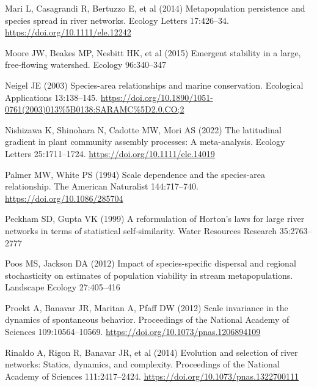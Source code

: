 \documentclass[
  12pt,
]{article}
\newlength{\cslhangindent}
\newlength{\cslentryspacingunit} %
\newenvironment{CSLReferences}[2] %
 {%
  \setlength{\parindent}{0pt}
  \ifodd #1
  \let\oldpar\par
  \def\par{\hangindent=\cslhangindent\oldpar}
  \fi
  \setlength{\parskip}{#2\cslentryspacingunit}
 }%
 {}
\begin{document}
\begin{CSLReferences}{1}{0}
\leavevmode{}%
Mari L, Casagrandi R, Bertuzzo E, et al (2014) Metapopulation persistence and species spread in river networks. Ecology Letters 17:426--34. \url{https://doi.org/10.1111/ele.12242}

\leavevmode{}%
Moore JW, Beakes MP, Nesbitt HK, et al (2015) Emergent stability in a large, free-flowing watershed. Ecology 96:340--347

\leavevmode{}%
Neigel JE (2003) Species-area relationships and marine conservation. Ecological Applications 13:138--145. \url{https://doi.org/10.1890/1051-0761(2003)013\%5B0138:SARAMC\%5D2.0.CO;2}

\leavevmode{}%
Nishizawa K, Shinohara N, Cadotte MW, Mori AS (2022) The latitudinal gradient in plant community assembly processes: {A} meta-analysis. Ecology Letters 25:1711--1724. \url{https://doi.org/10.1111/ele.14019}

\leavevmode{}%
Palmer MW, White PS (1994) Scale dependence and the species-area relationship. The American Naturalist 144:717--740. \url{https://doi.org/10.1086/285704}

\leavevmode{}%
Peckham SD, Gupta VK (1999) A reformulation of {Horton}'s laws for large river networks in terms of statistical self-similarity. Water Resources Research 35:2763--2777

\leavevmode{}%
Poos MS, Jackson DA (2012) Impact of species-specific dispersal and regional stochasticity on estimates of population viability in stream metapopulations. Landscape Ecology 27:405--416

\leavevmode{}%
Proekt A, Banavar JR, Maritan A, Pfaff DW (2012) Scale invariance in the dynamics of spontaneous behavior. Proceedings of the National Academy of Sciences 109:10564--10569. \url{https://doi.org/10.1073/pnas.1206894109}

\leavevmode{}%
Rinaldo A, Rigon R, Banavar JR, et al (2014) Evolution and selection of river networks: {Statics}, dynamics, and complexity. Proceedings of the National Academy of Sciences 111:2417--2424. \url{https://doi.org/10.1073/pnas.1322700111}


\end{CSLReferences}
\end{document}
